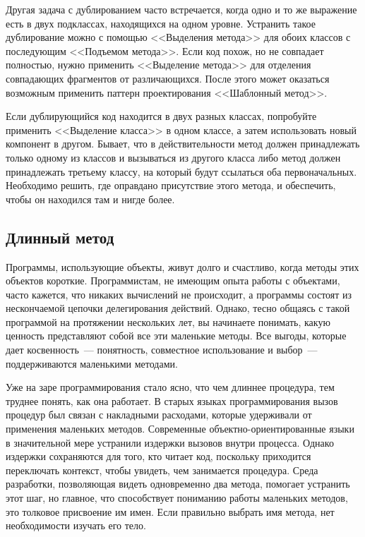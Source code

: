 \documentclass{../../text-style}
\begin{document}
Другая задача с дублированием часто встречается, когда одно и то же выражение есть в двух подклассах, находящихся на одном уровне. Устранить такое дублирование можно с помощью <<Выделения метода>> для обоих классов с последующим <<Подъемом метода>>. Если код похож, но не совпадает полностью, нужно применить <<Выделение метода>> для отделения совпадающих фрагментов от различающихся. После этого может оказаться возможным применить паттерн проектирования <<Шаблонный метод>>. 

Если дублирующийся код находится в двух разных классах, попробуйте применить <<Выделение класса>> в одном классе, а затем использовать новый компонент в другом. Бывает, что в действительности метод должен принадлежать только одному из классов и вызываться из другого класса либо метод должен принадлежать третьему классу, на который будут ссылаться оба первоначальных. Необходимо решить, где оправдано присутствие этого метода, и обеспечить, чтобы он находился там и нигде более.

\subsection{Длинный метод}

Программы, использующие объекты, живут долго и счастливо, когда методы этих объектов короткие. Программистам, не имеющим опыта работы с объектами, часто кажется, что никаких вычислений не происходит, а программы состоят из нескончаемой цепочки делегирования действий. Однако, тесно общаясь с такой программой на протяжении нескольких лет, вы начинаете понимать, какую ценность представляют собой все эти маленькие методы. Все выгоды, которые дает косвенность~--- понятность, совместное использование и выбор~--- поддерживаются маленькими методами.

Уже на заре программирования стало ясно, что чем длиннее процедура, тем труднее понять, как она работает. В старых языках программирования вызов процедур был связан с накладными расходами, которые удерживали от применения маленьких методов. Современные объектно-ориентированные языки в значительной мере устранили издержки вызовов внутри процесса. Однако издержки сохраняются для того, кто читает код, поскольку приходится переключать контекст, чтобы увидеть, чем занимается процедура. Среда разработки, позволяющая видеть одновременно два метода, помогает устранить этот шаг, но главное, что способствует пониманию работы маленьких методов, это толковое присвоение им имен. Если правильно выбрать имя метода, нет необходимости изучать его тело.
\end{document}
